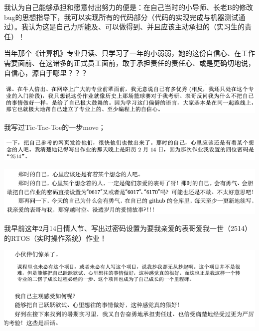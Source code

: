 \documentclass[9pt, b5paper]{article}
\begin{document}
我认为自己能够承担和愿意付出努力的便是：在自己当时的小导师、长老B的修改bug的思想指导下，我可以实现所有的代码部分（代码的实现完成与机器测试通过）。我认为这是自己力所能及、可以做得到、并且应该主动承担的（实习生的责任）！ 

当年那个《计算机》专业只读、只学习了一年的小弱弱，她的这份自信心、在工作需要面前、在这诸多的正式员工面前，敢于承担责任的责任心、或是更确切地说，自信心，源自于哪里？？？

\begin{center}
\includegraphics[width=.9\linewidth]{./pic/backups_plans_20210502_114726.png}
\end{center}

我写过Tic-Tac-Toe的一步move；

\begin{center}
\includegraphics[width=.9\linewidth]{./pic/backups_plans_20210502_120523.png}
\end{center}

\begin{center}
\includegraphics[width=.9\linewidth]{./pic/backups_plans_20210507_111947.png}
\end{center}

我早前这年2月14日情人节、写出过密码设置为要我亲爱的表哥爱我一世（2514）的RTOS（实时操作系统）作业！

\begin{center}
\includegraphics[width=.9\linewidth]{./pic/backups_plans_20210507_111500.png}
\end{center}
\end{document}

